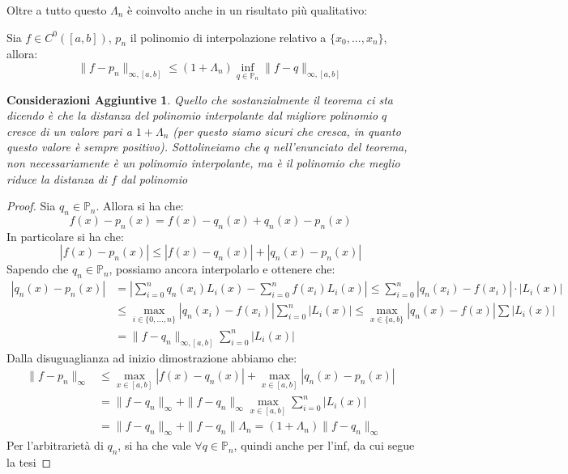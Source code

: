 \documentclass[11pt,a4paper,twoside]{article}
\newtheorem*{cons}{Considerazioni Aggiuntive}
\theoremstyle{definition}
\begin{document}
Oltre a tutto questo $\Lambda_n$ è coinvolto anche in un risultato più qualitativo:

\begin{thm}{}{}
	Sia $f \in C^0([a,b])$, $p_n$ il polinomio di interpolazione relativo a $\{x_0,...,x_n\}$, allora:
	\[ \|f - p_n\|_{\infty, [a,b]}\leq (1 + \Lambda_n) \inf_{q \in \mathbb P_n}\|f-q\|_{\infty, [a,b]} \]
\end{thm}

\begin{cons}
	Quello che sostanzialmente il teorema ci sta dicendo è che la distanza del polinomio interpolante dal migliore polinomio $q$ cresce di un valore pari a $1 + \Lambda_n$ (per questo siamo sicuri che cresca, in quanto questo valore è sempre positivo). Sottolineiamo che $q$ nell'enunciato del teorema, non necessariamente è un polinomio interpolante, ma è il polinomio che meglio riduce la distanza di $f$ dal polinomio
\end{cons}

\begin{proof}
	Sia $q_n \in \mathbb P_n$. Allora si ha che:
	\[ f(x)-p_n(x) = f(x) - q_n(x) + q_n(x) - p_n(x) \]
	In particolare si ha che:
	\[ |f(x) - p_n(x)| \leq |f(x)-q_n(x)| + |q_n(x) - p_n(x)| \]
	Sapendo che $q_n \in \mathbb P_n$, possiamo ancora interpolarlo e ottenere che:
	\begin{align*}
		|q_n(x) - p_n(x)| &= \left| \sum_{i = 0}^n q_n(x_i) L_i(x)- \sum_{i =0}^n f(x_i)L_i(x)\right| \leq \sum_{i = 0}^n |q_n(x_i) - f(x_i)|\cdot |L_i(x)|\\
		&\leq \max_{i \in \{0,...,n\}} |q_n(x_i) - f(x_i)| \sum_{i = 0}^n |L_i(x)|\leq \max_{x \in \{a,b\}} |q_n(x) - f(x)|\sum|L_i(x)|\\
		&= \|f-q_n\|_{\infty, [a,b]} \sum_{i = 0}^n |L_i(x)|
	\end{align*}
	Dalla disuguaglianza ad inizio dimostrazione abbiamo che:
	\begin{align*}
		\|f - p_n\|_{\infty} &\leq \max_{x \in [a,b]} |f(x) - q_n(x)| + \max_{x \in [a,b]} |q_n(x) - p_n(x)|\\
		&= \|f-q_n\|_\infty + \|f-q_n\|_\infty \max_{x \in [a,b]} \sum_{i = 0}^n|L_i(x)|\\
		&= \|f-q_n\|_\infty + \|f - q_n\| \Lambda_n = (1 + \Lambda_n)\|f-q_n\|_\infty
	\end{align*}
	Per l'arbitrarietà di $q_n$, si ha che vale $\forall q \in \mathbb P_n$, quindi anche per l'inf, da cui segue la tesi
\end{proof}
\end{document}
